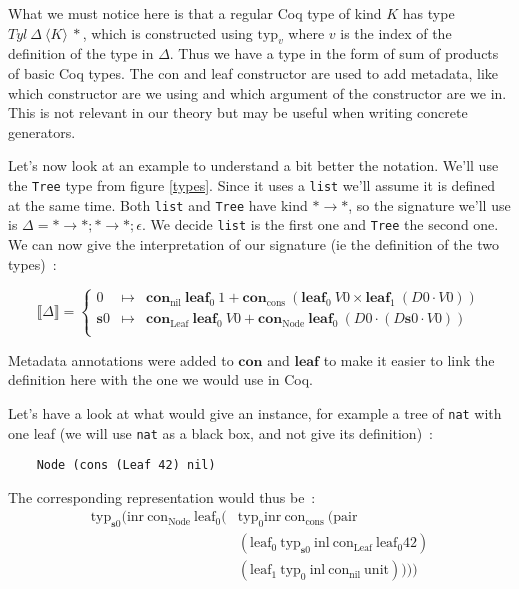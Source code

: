 \documentclass{article}
\newcommand{\lbr}{\llbracket}
\newcommand{\rbr}{\rrbracket}
\newcommand{\sem}[1]{\lbr {#1} \rbr}
\newcommand{\msig}[1]{\langle {#1} \rangle}
\newcommand{\suc}{\mathbf{s}}
\newcommand{\con}{\mathbf{con}}
\newcommand{\lf}{\mathbf{leaf}}
\begin{document}
What we must notice here is that a regular Coq type of kind $K$ has type
$Tyl\ \Delta\ \msig{K}\ *$, which is constructed using $\text{typ}_v$ where
$v$ is the index of the definition of the type in $\Delta$. Thus we have a
type in the form of sum of products of basic Coq types. The con and leaf constructor
are used to add metadata, like which constructor are we using and which argument
of the constructor are we in. This is not relevant in our theory but may be
useful when writing concrete generators.

Let's now look at an example to understand a bit better the notation. We'll use
the \texttt{Tree} type from figure \ref{types}. Since it uses a \texttt{list}
we'll assume it is defined at the same time. Both \texttt{list} and \texttt{Tree}
have kind $*\rightarrow *$, so the signature we'll use is
$\Delta = *\rightarrow *; *\rightarrow *; \epsilon$. We decide \texttt{list} is the first
one and \texttt{Tree} the second one. We can now give the interpretation of our
signature (ie the definition of the two types)~:

\[\sem{\Delta} = \left\{\begin{array}{rcl}
    0 & \mapsto & \con_{\text{nil}}\ \lf_0\ 1 + \con_{\text{cons}}\ (\lf_0\ V0 \times \lf_1\ (D0\cdot V0)) \\
    \suc 0 & \mapsto & \con_{\text{Leaf}}\ \lf_0\ V0
        + \con_{\text{Node}}\ \lf_0\ (D0\cdot (D\suc 0\cdot V0)) \\
\end{array}\right.\]

Metadata annotations were added to $\con$ and $\lf$ to make it easier to link
the definition here with the one we would use in Coq.

Let's have a look at what would give an instance, for example a tree of \texttt{nat}
with one leaf (we will use \texttt{nat} as a black box, and not give its
definition)~:
\begin{verbatim}
    Node (cons (Leaf 42) nil)
\end{verbatim}

The corresponding representation would thus be~:
\begin{align*} \text{typ}_{\suc 0} (\text{inr}\ \text{con}_\text{Node}\ \text{leaf}_0
    (&\text{typ}_0 \text{inr}\ \text{con}_\text{cons}\ (\text{pair} \\
        &(\text{leaf}_0\ \text{typ}_{\suc 0}\ \text{inl}\ \text{con}_\text{Leaf}\ \text{leaf}_0 42) \\
        &(\text{leaf}_1\ \text{typ}_0\ \text{inl}\ \text{con}_\text{nil}\ \text{unit})
    ))
)
\end{align*}
\end{document}
